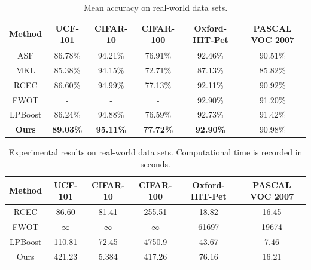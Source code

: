 \documentclass[letterpaper]{article}
\begin{document}
\begin{table}[t]
\small
\centering
\caption{Mean accuracy on real-world data sets.}
\begin{tabular}{c|c|c|c|c|c}
\hline
Method              & UCF-101          & CIFAR-10         & CIFAR-100        & Oxford-IIIT-Pet & PASCAL VOC 2007    \\\hline
ASF                 & 86.78\%          & 94.21\%          & 76.91\%          & 92.46\%         &   90.51\%          \\
MKL                 & 85.38\%          & 94.15\%          & 72.71\%          & 87.13\%         &   85.82\%          \\
RCEC                & 86.60\%          & 94.99\%          & 77.13\%          & 92.11\%         &   90.92\%          \\
FWOT                & -                & -                & -                & 92.90\%         &   91.20\%          \\
LPBoost             & 86.24\%          & 94.88\%          & 76.59\%          & 92.73\%         &   91.42\%          \\\hline
\textbf{Ours}       & \textbf{89.03\%} & \textbf{95.11\%} & \textbf{77.72\%} & \textbf{92.90\%}&   90.98\%          \\
\hline
\end{tabular}
\label{table:total_acc}
\end{table}


\begin{table}[t]
\small
\centering
\caption{Experimental results on real-world data sets. Computational time is recorded in seconds.}
\begin{tabular}{c|c|c|c|c|c}
\hline
Method              & UCF-101    & CIFAR-10  & CIFAR-100  & Oxford-IIIT-Pet & PASCAL VOC 2007 \\\hline
RCEC                & 86.60      & 81.41     &  255.51    & 18.82           &   16.45         \\
FWOT                & $\infty$   & $\infty$  & $\infty$   & 61697           &   19674         \\
LPBoost             & 110.81     & 72.45     &  4750.9    & 43.67           &   7.46          \\\hline
Ours                & 421.23     & 5.384     &  417.26    & 76.16           &   16.21         \\
\hline
\end{tabular}
\label{table:total_time}
\end{table}
\end{document}
